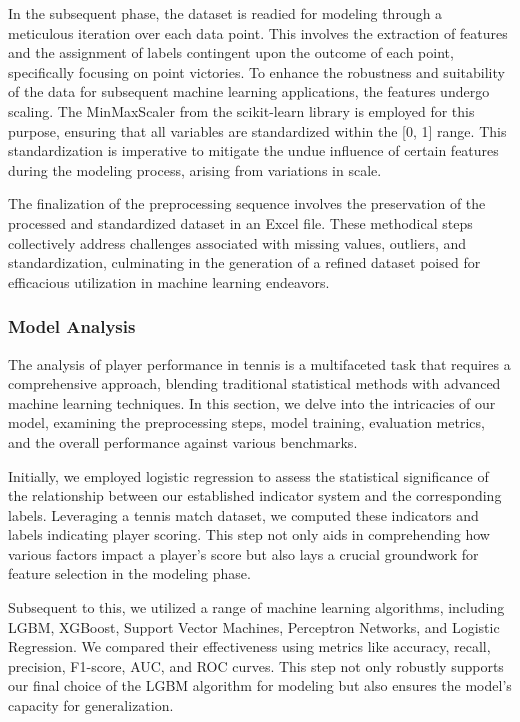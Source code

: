 \documentclass[12pt]{article}
\begin{document}
In the subsequent phase, the dataset is readied for modeling through a meticulous iteration over each data point. This involves the extraction of features and the assignment of labels contingent upon the outcome of each point, specifically focusing on point victories. To enhance the robustness and suitability of the data for subsequent machine learning applications, the features undergo scaling. The MinMaxScaler from the scikit-learn library is employed for this purpose, ensuring that all variables are standardized within the [0, 1] range. This standardization is imperative to mitigate the undue influence of certain features during the modeling process, arising from variations in scale.

The finalization of the preprocessing sequence involves the preservation of the processed and standardized dataset in an Excel file. These methodical steps collectively address challenges associated with missing values, outliers, and standardization, culminating in the generation of a refined dataset poised for efficacious utilization in machine learning endeavors.
\subsubsection{Model Analysis}
The analysis of player performance in tennis is a multifaceted task that requires a comprehensive approach, blending traditional statistical methods with advanced machine learning techniques. In this section, we delve into the intricacies of our model, examining the preprocessing steps, model training, evaluation metrics, and the overall performance against various benchmarks.

Initially, we employed logistic regression to assess the statistical significance of the relationship between our established indicator system and the corresponding labels. Leveraging a tennis match dataset, we computed these indicators and labels indicating player scoring. This step not only aids in comprehending how various factors impact a player's score but also lays a crucial groundwork for feature selection in the modeling phase.

Subsequent to this, we utilized a range of machine learning algorithms, including LGBM, XGBoost, Support Vector Machines, Perceptron Networks, and Logistic Regression. We compared their effectiveness using metrics like accuracy, recall, precision, F1-score, AUC, and ROC curves. This step not only robustly supports our final choice of the LGBM algorithm for modeling but also ensures the model's capacity for generalization.
\end{document}
